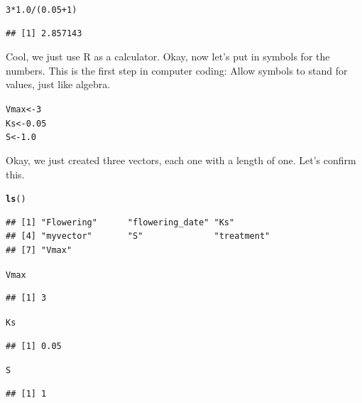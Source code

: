 \documentclass{tufte-handout}\usepackage[]{graphicx}\usepackage[]{xcolor}
\makeatletter
\newcommand{\hlnum}[1]{\textcolor[rgb]{0.686,0.059,0.569}{#1}}%
\newcommand{\hlopt}[1]{\textcolor[rgb]{0,0,0}{#1}}%
\newcommand{\hlstd}[1]{\textcolor[rgb]{0.345,0.345,0.345}{#1}}%
\newcommand{\hlkwb}[1]{\textcolor[rgb]{0.69,0.353,0.396}{#1}}%
\newcommand{\hlkwd}[1]{\textcolor[rgb]{0.737,0.353,0.396}{\textbf{#1}}}%
\newenvironment{kframe}{%
 \def\at@end@of@kframe{}%
 \ifinner\ifhmode%
  \def\at@end@of@kframe{\end{minipage}}%
  \begin{minipage}{\columnwidth}%
 \fi\fi%
 \def\FrameCommand##1{\hskip\@totalleftmargin \hskip-\fboxsep
 \colorbox{shadecolor}{##1}\hskip-\fboxsep
     \hskip-\linewidth \hskip-\@totalleftmargin \hskip\columnwidth}%
 \MakeFramed {\advance\hsize-\width
   \@totalleftmargin\z@ \linewidth\hsize
   \@setminipage}}%
 {\par\unskip\endMakeFramed%
 \at@end@of@kframe}
\newenvironment{knitrout}{}{} %
\makeatother
\begin{document}
\begin{knitrout}
\color{fgcolor}\begin{kframe}
\begin{alltt}
\hlnum{3}\hlopt{*}\hlnum{1.0}\hlopt{/}\hlstd{(}\hlnum{0.05}\hlopt{+}\hlnum{1}\hlstd{)}
\end{alltt}
\begin{verbatim}
## [1] 2.857143
\end{verbatim}
\end{kframe}
\end{knitrout}

Cool, we just use R as a calculator. Okay, now let's put in symbols for the numbers. This is the first step in computer coding: Allow symbols to stand for values, just like algebra.  

\begin{knitrout}
\color{fgcolor}\begin{kframe}
\begin{alltt}
\hlstd{Vmax} \hlkwb{<-} \hlnum{3}
\hlstd{Ks} \hlkwb{<-} \hlnum{0.05}
\hlstd{S} \hlkwb{<-} \hlnum{1.0}
\end{alltt}
\end{kframe}
\end{knitrout}

Okay, we just created three vectors, each one with a length of one. Let's confirm this.

\begin{knitrout}
\color{fgcolor}\begin{kframe}
\begin{alltt}
\hlkwd{ls}\hlstd{()}
\end{alltt}
\begin{verbatim}
## [1] "Flowering"      "flowering_date" "Ks"            
## [4] "myvector"       "S"              "treatment"     
## [7] "Vmax"
\end{verbatim}
\begin{alltt}
\hlstd{Vmax}
\end{alltt}
\begin{verbatim}
## [1] 3
\end{verbatim}
\begin{alltt}
\hlstd{Ks}
\end{alltt}
\begin{verbatim}
## [1] 0.05
\end{verbatim}
\begin{alltt}
\hlstd{S}
\end{alltt}
\begin{verbatim}
## [1] 1
\end{verbatim}
\end{kframe}
\end{knitrout}
\end{document}
